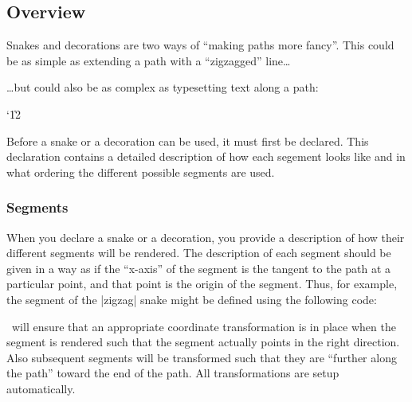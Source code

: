 \subsection{Overview}

Snakes and decorations are two ways of ``making paths more fancy''. 
This could be as simple as extending a path with a ``zigzagged'' 
line\ldots 

\begin{codeexample}[]
\end{codeexample}

\ldots but could also be as complex as typesetting text along a path:

{\catcode`\|12
\begin{codeexample}[]
\end{codeexample}
}


Before a snake or a decoration can be used, it must first be declared. 
This declaration contains a detailed description of how each segement 
looks like and in what ordering the different possible 
segments are used.


\subsubsection{Segments}


When you declare a snake or a decoration, you provide a description 
of how their different segments will be rendered. The description of
each segment should be given in a way as if the ``x-axis'' of the
segment is the tangent to the path at a particular point,
and that point is the origin of the segment.
Thus, for example, the segment of the |zigzag| snake might be
defined using the following code: 
\begin{codeexample}
\pgfpathlineto{\pgfpoint{5pt}{5pt}}
\pgfpathlineto{\pgfpoint{15pt}{-5pt}}
\pgfpathlineto{\pgfpoint{20pt}{0pt}}
\end{codeexample}

\pgfname\ will ensure that an appropriate coordinate transformation
is in place when the segment is rendered such that
the segment actually points in the right direction. Also
subsequent segments will be transformed such that they are
``further along the path'' toward the end of the path.
All transformations are setup automatically.

